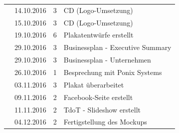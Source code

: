 \documentclass[12pt]{article}
\begin{document}
\begin{table}[hp]
\begin{tabular}{|l|r|c|l|}
                                                                                   & 14.10.2016                          & 3                                          & CD (Logo-Umsetzung)                     \\ \cline{2-4} 
                                                                                   & 15.10.2016                          & 3                                          & CD (Logo-Umsetzung)                     \\ \cline{2-4} 
                                                                                   & 19.10.2016                          & 6                                          & Plakatentwürfe erstellt                 \\ \cline{2-4} 
                                                                                   & 29.10.2016                          & 3                                          & Businessplan - Executive Summary        \\ \cline{2-4} 
                                                                                   & 29.10.2016                          & 3                                          & Businessplan - Unternehmen              \\ \cline{2-4} 
                                                                                   & 26.10.2016                          & 1                                          & Besprechung mit Ponix Systems           \\ \cline{2-4} 
                                                                                   & 03.11.2016                          & 3                                          & Plakat überarbeitet                     \\ \cline{2-4} 
                                                                                   & 09.11.2016                          & 2                                          & Facebook-Seite erstellt                 \\ \cline{2-4} 
                                                                                   & 11.11.2016                          & 2                                          & TdoT - Slideshow erstellt               \\ \cline{2-4} 
                                                                                   & 04.12.2016                          & 2                                          & Fertigstellung des Mockups              \\ \cline{2-4} 

\end{tabular}
\end{table}
\end{document}
